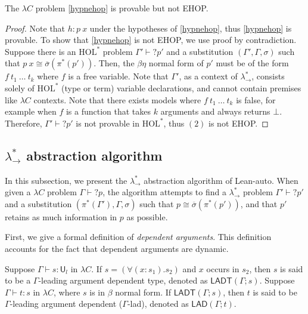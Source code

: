\begin{theorem}
  The $\lambda C$ problem \eqref{hypnehop} is provable but not EHOP.
\end{theorem}
\begin{proof}
  Note that $h : p \ x$ under the hypotheses of \eqref{hypnehop}, thus \eqref{hypnehop} is provable.
  To show that \eqref{hypnehop} is not EHOP, we use proof by contradiction. Suppose there
  is an $\text{HOL}^*$ problem $\Gamma' \vdash? p'$ and a substitution $(\Gamma', \Gamma, \sigma)$ such
  that $p \ x \cong \overline{\sigma}(\pi^*(p'))$. Then, the $\beta\eta$ normal form of $p'$ must be of the form
  $f \ t_1 \ \dots \ t_k$ where $f$ is a free variable. Note that $\Gamma'$, as a context of $\lambda_\to^*$,
  consists solely of $\text{HOL}^*$ (type or term) variable declarations, and cannot contain
  premises like $\lambda C$ contexts. Note that there exists models where $f \ t_1 \ \dots \ t_k$
  is false, for example when $f$ is a function that takes $k$ arguments and always returns $\bot$.
  Therefore, $\Gamma' \vdash? p'$ is not provable in $\text{HOL}^*$, thus $(2)$ is not EHOP.
\end{proof}

\subsection{$\lambda_\to^*$ abstraction algorithm}\label{labstalgo}

In this subsection, we present the $\lambda_\to^*$ abstraction algorithm of Lean-auto. When given a
$\lambda C$ problem $\Gamma \vdash? p$, the algorithm attempts to find a $\lambda_\to^*$
problem $\Gamma' \vdash? p'$ and a substitution $(\pi^*(\Gamma'), \Gamma, \sigma)$ such that
$p \cong \overline{\sigma}(\pi^*(p'))$, and that $p'$ retains as much information in $p$ as possible.

First, we give a formal definition of \textit{dependent arguments}. This definition accounts for
the fact that dependent arguments are dynamic.

\begin{definition} Suppose $\Gamma \vdash s : \mathsf{U}_l$ in $\lambda C$.
  If $s = (\forall (x : s_1). s_2)$ and $x$ occurs in $s_2$,
  then $s$ is said to be a $\Gamma$-leading argument dependent type,
  denoted as $\mathsf{LADT}(\Gamma; s)$. Suppose $\Gamma \vdash t : s$ in $\lambda C$, where $s$
  is in $\beta$ normal form. If $\mathsf{LADT}(\Gamma; s)$, then $t$ is said to be
  $\Gamma$-leading argument dependent ($\Gamma$-lad), denoted as $\mathsf{LAD}(\Gamma; t)$.
\end{definition}

